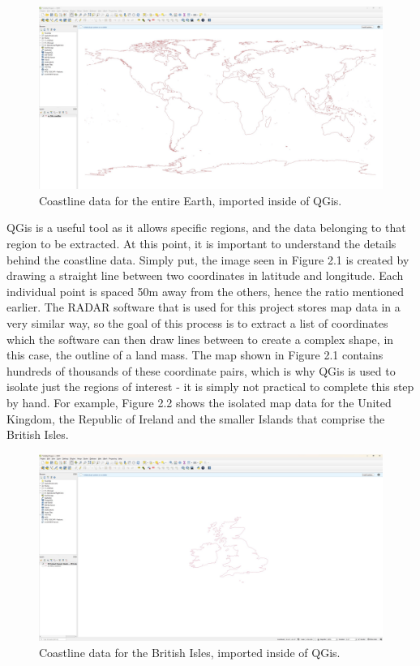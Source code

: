 \documentclass[stu, a4paper, 12pt, floatsintext]{apa7}
\numberwithin{figure}{section}
\numberwithin{table}{section}
\numberwithin{equation}{section}
\begin{document}
\begin{figure}[H]
    \caption{Coastline data for the entire Earth, imported inside of QGis.}
    \label{fig:2.1}
    \centering
    \includegraphics[width=1.1\textwidth]{pictures/Figure 2.1 FYP.jpg}    
\end{figure}

QGis is a useful tool as it allows specific regions, and the data belonging to that region to be extracted. At this point, it is important to understand the details behind the coastline data. Simply put, the image seen in Figure 2.1 is created by drawing a straight line between two coordinates in latitude and longitude. Each individual point is spaced 50m away from the others, hence the ratio mentioned earlier. The RADAR software that is used for this project stores map data in a very similar way, so the goal of this process is to extract a list of coordinates which the software can then draw lines between to create a complex shape, in this case, the outline of a land mass. The map shown in Figure 2.1 contains hundreds of thousands of these coordinate pairs, which is why QGis is used to isolate just the regions of interest - it is simply not practical to complete this step by hand. For example, Figure 2.2 shows the isolated map data for the United Kingdom, the Republic of Ireland and the smaller Islands that comprise the British Isles. 

\begin{figure}[H]
    \caption{Coastline data for the British Isles, imported inside of QGis.}
    \label{fig:2.2}
    \centering
    \includegraphics[width=1.1\textwidth]{pictures/Figure 2.2 FYP.jpg}    
\end{figure}
\end{document}
